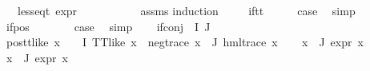 \begin{isabellebody}
\ \ \ {\isachardoublequoteopen}less{\isacharunderscore}{\kern0pt}eq{\isacharunderscore}{\kern0pt}t\ {\isacharparenleft}{\kern0pt}expr\ {\isasymphi}{\isacharparenright}{\kern0pt}\ {\isacharparenleft}{\kern0pt}{\isasyminfinity}{\isacharcomma}{\kern0pt}\ {}{\isacharcomma}{\kern0pt}\ {}{\isacharcomma}{\kern0pt}\ {}{\isacharcomma}{\kern0pt}\ {\isasyminfinity}{\isacharcomma}{\kern0pt}\ {}{\isacharparenright}{\kern0pt}{\isachardoublequoteclose}\isanewline
%
\isadelimproof
\ \ %
\endisadelimproof
%
\isatagproof
{}\isamarkupfalse%
\ assms\isanewline
{}\isamarkupfalse%
{\isacharparenleft}{\kern0pt}induction\ {\isasymphi}{\isacharparenright}{\kern0pt}\isanewline
\ \ \isamarkupfalse%
\ if{\isacharunderscore}{\kern0pt}tt\isanewline
\ \ \isamarkupfalse%
\ \isamarkupfalse%
\ {\isacharquery}{\kern0pt}case\ \isamarkupfalse%
\ simp\isanewline
{}\isamarkupfalse%
\isanewline
\ \ \isamarkupfalse%
\ {\isacharparenleft}{\kern0pt}if{\isacharunderscore}{\kern0pt}pos\ {\isasymphi}\ {\isasymalpha}{\isacharparenright}{\kern0pt}\isanewline
\ \ \isamarkupfalse%
\ \isamarkupfalse%
\ {\isacharquery}{\kern0pt}case\ \isamarkupfalse%
\ simp\isanewline
{}\isamarkupfalse%
\isanewline
\ \ \isamarkupfalse%
\ {\isacharparenleft}{\kern0pt}if{\isacharunderscore}{\kern0pt}conj\ {\isasymPhi}\ I\ J{\isacharparenright}{\kern0pt}\isanewline
\ \ \isamarkupfalse%
\ pos{\isacharunderscore}{\kern0pt}tt{\isacharunderscore}{\kern0pt}like{\isacharcolon}{\kern0pt}\ {\isachardoublequoteopen}{\isasymforall}x\ {\isasymin}\ {\isacharparenleft}{\kern0pt}{\isasymPhi}\ {\isacharbackquote}{\kern0pt}\ I{\isacharparenright}{\kern0pt}{\isachardot}{\kern0pt}\ TT{\isacharunderscore}{\kern0pt}like\ x{\isachardoublequoteclose}\ \ neg{\isacharunderscore}{\kern0pt}trace{\isacharcolon}{\kern0pt}\ {\isachardoublequoteopen}{\isasymforall}x{\isasymin}{\isasymPhi}\ {\isacharbackquote}{\kern0pt}\ J{\isachardot}{\kern0pt}\ hml{\isacharunderscore}{\kern0pt}trace\ x{\isachardoublequoteclose}\isanewline
\ \ \isamarkupfalse%
\ {\isachardoublequoteopen}{\isasymforall}x{\isasymin}{\isasymPhi}\ {\isacharbackquote}{\kern0pt}\ J{\isachardot}{\kern0pt}\ expr{\isacharunderscore}{\kern0pt}{}\ x\ {\isacharequal}{\kern0pt}\ {}{\isachardoublequoteclose}\isanewline
{}\ {\isachardoublequoteopen}{\isasymforall}x{\isasymin}{\isasymPhi}\ {\isacharbackquote}{\kern0pt}\ J{\isachardot}{\kern0pt}\ expr{\isacharunderscore}{\kern0pt}{}\ x\ {\isacharequal}{\kern0pt}\ {}{\isachardoublequoteclose}\isanewline

\end{isabellebody}
